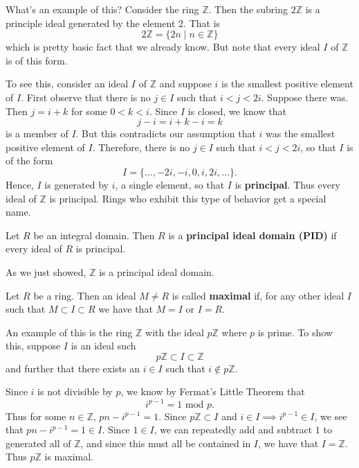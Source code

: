 \documentclass[12pt,letterpaper]{algebra_book}
\newcommand{\ZZ}{\mathbb{Z}}
\theoremstyle{definition}
\begin{document}
    What's an example of this? Consider the ring $\ZZ$. Then the
    subring $2\ZZ$ is a principle ideal generated by the element
    2. That is 
    \[
        2\ZZ = \{2n \mid n \in \ZZ\}
    \]
    which is pretty basic fact that we already know. But note that
    every ideal $I$ of $\ZZ$ is of this form. 

    \textcolor{NavyBlue}{To see this, consider an ideal $I$ of
    $\ZZ$ and suppose $i$ is the smallest positive element of $I$.
    First observe that there is no $j \in I$ such that $i < j <
    2i$. Suppose there was. Then $j = i + k$ for some $0 < k < i$.
    Since $I$ is closed, we know that 
    \[
        j - i = i + k - i = k   
    \]
    is a member of $I$. But this contradicts our assumption that
    $i$ was the smallest positive element of $I$. Therefore, there
    is no $j \in I$ such that $i < j < 2i$, so that $I$ is of the
    form 
    \[
        I = \{\dots, -2i, -i, 0, i, 2i, \dots\}.
    \]
    Hence, $I$ is generated by $i$, a single element, so that $I$
    is \textbf{principal}.
    }
    Thus every ideal of $\ZZ$ is principal. Rings who exhibit this
    type of behavior get a special name.  

    \begin{definition}
        Let $R$ be an integral domain. Then $R$ is a
        \textbf{principal ideal domain (PID)} if every ideal of
        $R$ is principal.
    \end{definition}
    As we just showed, $\ZZ$ is a principal ideal domain.

    \begin{definition}
        Let $R$ be a ring. Then an ideal $M \ne R$ is called
        \textbf{maximal} if, for any other ideal $I$ such that $M
        \subset I \subset R$ we have that $M = I$ or $I = R$. 
    \end{definition}

    An example of this is the ring $\ZZ$ with the ideal $p\ZZ$
    where $p$ is prime. To show this, suppose $I$ is an ideal such
    \[
        p\ZZ \subset I \subset \ZZ
    \]
    and further that there exists an $i \in I$ such that $i
    \not\in p\ZZ$. 

    Since $i$ is not divisible by $p$, we know by Fermat's Little
    Theorem that 
    \[ 
        i^{p-1} = 1 \mbox{ mod }p.
    \]
    Thus for some $n \in \ZZ$, $pn - i^{p-1} = 1.$ Since $p\ZZ \subset
    I$ and $i \in I \implies i^{p-1} \in I$, we see that $pn - i^{p-1} = 1 \in I$. Since $1 \in
    I$, we can repeatedly add and subtract $1$ to generated all of
    $\ZZ$, and since this must all be contained in $I$, we have that $I = \ZZ$. Thus $p\ZZ$ is maximal.
\end{document}
